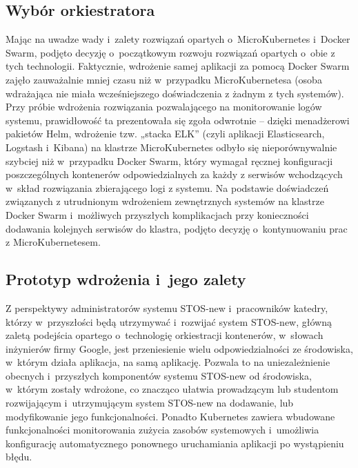 \subsection{Wybór orkiestratora}
Mając na uwadze wady i~zalety rozwiązań opartych o~MicroKubernetes i~Docker Swarm, podjęto decyzję o~początkowym rozwoju rozwiązań opartych o~obie z tych technologii. Faktycznie, wdrożenie samej aplikacji za pomocą Docker Swarm zajęło zauważalnie mniej czasu niż w~przypadku MicroKubernetesa (osoba wdrażająca nie miała wcześniejszego doświadczenia z żadnym z tych systemów). Przy próbie wdrożenia rozwiązania pozwalającego na monitorowanie logów systemu, prawidłowość ta prezentowała się zgoła odwrotnie -- dzięki menadżerowi pakietów Helm, wdrożenie tzw. „stacka ELK” (czyli aplikacji Elasticsearch, Logstash i~Kibana) na klastrze MicroKubernetes odbyło się nieporównywalnie szybciej niż w~przypadku Docker Swarm, który wymagał ręcznej konfiguracji poszczególnych kontenerów odpowiedzialnych za każdy z serwisów wchodzących w~skład rozwiązania zbierającego logi z systemu. Na podstawie doświadczeń związanych z utrudnionym wdrożeniem zewnętrznych systemów na klastrze Docker Swarm i~możliwych przyszłych komplikacjach przy konieczności dodawania kolejnych serwisów do klastra, podjęto decyzję o~kontynuowaniu prac z MicroKubernetesem.

\subsection{Prototyp wdrożenia i~jego zalety}
Z perspektywy administratorów systemu STOS-new i~pracowników katedry, którzy w~przyszłości będą utrzymywać i~rozwijać system STOS-new, główną zaletą podejścia opartego o~technologię orkiestracji kontenerów, w~słowach inżynierów firmy Google\cite{googleKubernetes}, jest przeniesienie wielu odpowiedzialności ze środowiska, w~którym działa aplikacja, na samą aplikację. Pozwala to na uniezależnienie obecnych i~przyszłych komponentów systemu STOS-new od środowiska, w~którym zostały wdrożone, co znacząco ułatwia prowadzącym lub studentom rozwijającym i~utrzymującym system STOS-new na dodawanie, lub modyfikowanie jego funkcjonalności. Ponadto Kubernetes zawiera wbudowane funkcjonalności monitorowania zużycia zasobów systemowych i~umożliwia konfigurację automatycznego ponownego uruchamiania aplikacji po wystąpieniu błędu\cite{k8sPod}.

